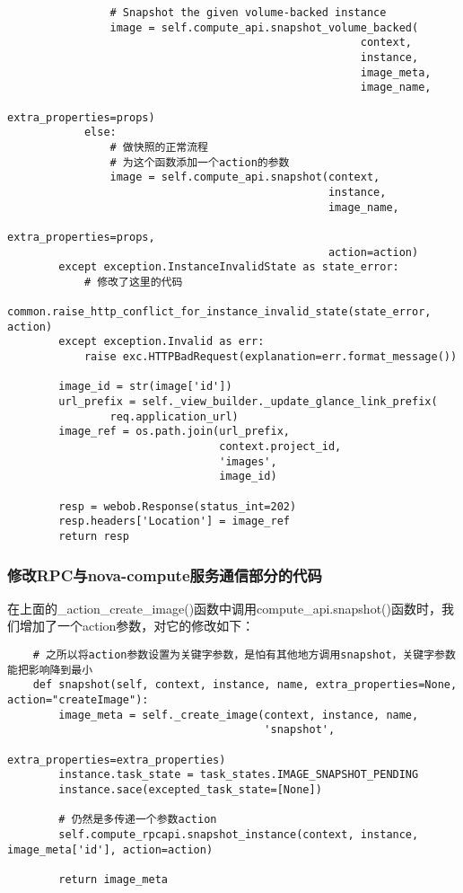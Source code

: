 \documentclass[a4paper,left=1.5cm,right=1.5cm,11pt]{article}
\begin{document}
\begin{lstlisting}
                # Snapshot the given volume-backed instance
                image = self.compute_api.snapshot_volume_backed(
                                                       context,
                                                       instance,
                                                       image_meta,
                                                       image_name,
                                                       extra_properties=props)
            else:
                # 做快照的正常流程
                # 为这个函数添加一个action的参数
                image = self.compute_api.snapshot(context,
                                                  instance,
                                                  image_name,
                                                  extra_properties=props,
                                                  action=action)
        except exception.InstanceInvalidState as state_error:
            # 修改了这里的代码
            common.raise_http_conflict_for_instance_invalid_state(state_error, action)
        except exception.Invalid as err:
            raise exc.HTTPBadRequest(explanation=err.format_message())

        image_id = str(image['id'])
        url_prefix = self._view_builder._update_glance_link_prefix(
                req.application_url)
        image_ref = os.path.join(url_prefix,
                                 context.project_id,
                                 'images',
                                 image_id)

        resp = webob.Response(status_int=202)
        resp.headers['Location'] = image_ref
        return resp
    \end{lstlisting}

\subsubsection{修改RPC与nova-compute服务通信部分的代码}
    在上面的\_action\_create\_image()函数中调用compute\_api.snapshot()函数时，我们增加了一个action参数，对它的修改如下：
    \begin{lstlisting}
    # 之所以将action参数设置为关键字参数，是怕有其他地方调用snapshot，关键字参数能把影响降到最小
    def snapshot(self, context, instance, name, extra_properties=None, action="createImage"):
        image_meta = self._create_image(context, instance, name,
                                        'snapshot',
                                        extra_properties=extra_properties)
        instance.task_state = task_states.IMAGE_SNAPSHOT_PENDING
        instance.sace(excepted_task_state=[None])

        # 仍然是多传递一个参数action
        self.compute_rpcapi.snapshot_instance(context, instance, image_meta['id'], action=action)

        return image_meta
    \end{lstlisting}
\end{document}
